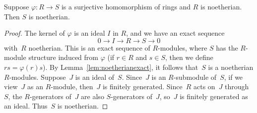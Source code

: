 \begin{lemma}\label{lem:surjnoetherian}
  Suppose $\varphi:R\to S$ is a surjective homomorphism of
  rings and $R$ is noetherian. Then $S$ is noetherian.
\end{lemma}
\begin{proof}
  The kernel of $\varphi$ is an ideal $I$ in $R$, and
  we have an exact sequence
  $$
    0 \to I \to R \to S \to 0
  $$
  with~$R$ noetherian.
  This is an exact sequence of $R$-modules, where $S$ has the
  $R$-module structure induced from $\varphi$ (if $r\in R$
  and $s\in S$, then we define $rs = \varphi(r)s$).
  By Lemma~\ref{lem:noetherianexact}, it follows
  that~$S$ is a noetherian $R$-modules. Suppose~$J$ is an ideal of~$S$.
  Since~$J$ is an $R$-submodule of~$S$, if we view~$J$ as an $R$-module,
  then~$J$ is finitely generated. Since~$R$ acts on~$J$ through~$S$,
  the $R$-generators of~$J$ are also $S$-generators of~$J$, so~$J$
  is finitely generated as an ideal. Thus~$S$ is noetherian.
\end{proof}

